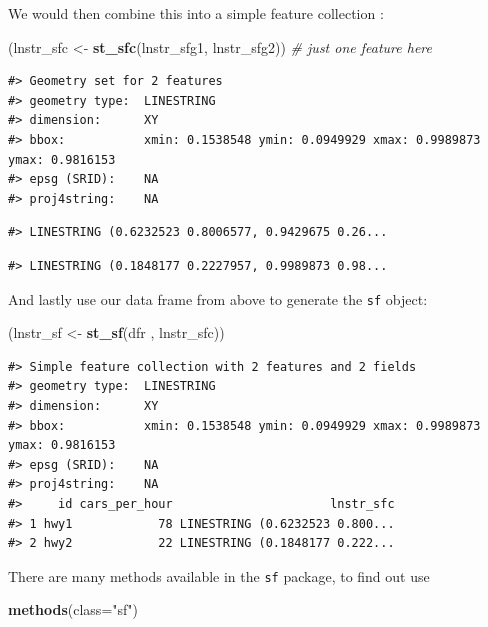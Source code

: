\documentclass[]{book}
\newenvironment{Shaded}{\begin{snugshade}}{\end{snugshade}}
\newcommand{\KeywordTok}[1]{\textcolor[rgb]{0.13,0.29,0.53}{\textbf{#1}}}
\newcommand{\DataTypeTok}[1]{\textcolor[rgb]{0.13,0.29,0.53}{#1}}
\newcommand{\StringTok}[1]{\textcolor[rgb]{0.31,0.60,0.02}{#1}}
\newcommand{\CommentTok}[1]{\textcolor[rgb]{0.56,0.35,0.01}{\textit{#1}}}
\newcommand{\NormalTok}[1]{#1}
\begin{document}
We would then combine this into a simple feature collection :

\begin{Shaded}
\begin{Highlighting}[]
\NormalTok{(lnstr_sfc <-}\StringTok{ }\KeywordTok{st_sfc}\NormalTok{(lnstr_sfg1, lnstr_sfg2)) }\CommentTok{# just one feature here}
\end{Highlighting}
\end{Shaded}

\begin{verbatim}
#> Geometry set for 2 features 
#> geometry type:  LINESTRING
#> dimension:      XY
#> bbox:           xmin: 0.1538548 ymin: 0.0949929 xmax: 0.9989873 ymax: 0.9816153
#> epsg (SRID):    NA
#> proj4string:    NA
\end{verbatim}

\begin{verbatim}
#> LINESTRING (0.6232523 0.8006577, 0.9429675 0.26...
\end{verbatim}

\begin{verbatim}
#> LINESTRING (0.1848177 0.2227957, 0.9989873 0.98...
\end{verbatim}

And lastly use our data frame from above to generate the \texttt{sf}
object:

\begin{Shaded}
\begin{Highlighting}[]
\NormalTok{(lnstr_sf <-}\StringTok{ }\KeywordTok{st_sf}\NormalTok{(dfr , lnstr_sfc))}
\end{Highlighting}
\end{Shaded}

\begin{verbatim}
#> Simple feature collection with 2 features and 2 fields
#> geometry type:  LINESTRING
#> dimension:      XY
#> bbox:           xmin: 0.1538548 ymin: 0.0949929 xmax: 0.9989873 ymax: 0.9816153
#> epsg (SRID):    NA
#> proj4string:    NA
#>     id cars_per_hour                      lnstr_sfc
#> 1 hwy1            78 LINESTRING (0.6232523 0.800...
#> 2 hwy2            22 LINESTRING (0.1848177 0.222...
\end{verbatim}

There are many methods available in the \texttt{sf} package, to find out
use

\begin{Shaded}
\begin{Highlighting}[]
\KeywordTok{methods}\NormalTok{(}\DataTypeTok{class=}\StringTok{"sf"}\NormalTok{)}
\end{Highlighting}
\end{Shaded}
\end{document}
